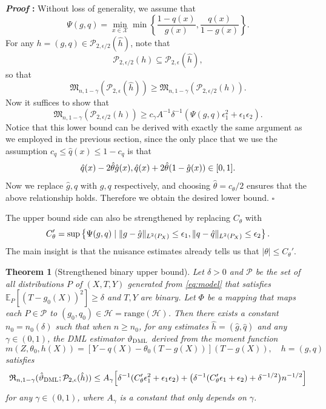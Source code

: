 \documentclass{article}
\def\eps{{\epsilon}}
\def\gH{{\mathcal{H}}}
\def\gP{{\mathcal{P}}}
\def\gX{{\mathcal{X}}}
\newcommand{\E}{\mathbb{E}}
\newtheorem{theorem}{Theorem}[section]
\renewenvironment{proof}{\noindent\textbf{\textit{Proof }:}}{\hfill$\square$}
\newcommand{\dml}{\textsc{DML}}
\begin{document}
\begin{proof}
    Without loss of generality, we assume that
    $$\Psi(g,q)=\min_{x\in\gX}\min\left\{\frac{1-q(x)}{g(x)},\frac{q(x)}{1-g(x)}\right\}.$$
    For any $h=(g,q)\in\gP_{2,\eps/2}(\hat{h})$, note that
    $$\gP_{2,\eps/2}(h) \subseteq \gP_{2,\eps}(\hat{h}),$$
    so that
    $$\mathfrak{M}_{n,1-\gamma}\left(\gP_{2,\eps}(\hat{h})\right) \geq \mathfrak{M}_{n,1-\gamma}\left(\gP_{2,\eps/2}(h)\right).$$
    Now it suffices to show that
    \begin{equation}
        \label{eq:lower-bound-half-radius}
        \mathfrak{M}_{n,1-\gamma}\left(\gP_{2,\eps/2}(h)\right) \geq c_{\gamma}  A^{-1} \delta^{-1}(\Psi(g,q)\eps_1^2+\eps_1\eps_2).
    \end{equation}
    Notice that this lower bound can be derived with exactly the same argument as we employed in the previous section, since the only place that we use the assumption $c_q\leq \hat{q}(x)\leq 1-c_q$ is that
    \begin{equation}
        \notag
        \hat{q}(x)-2\hat{\theta}\hat{g}(x), \hat{q}(x)+2\hat{\theta}(1-\hat{g}(x)) \in [0,1].
    \end{equation}
    Now we replace $\hat{g},\hat{q}$ with $g,q$ respectively, and choosing $\hat{\theta}=c_\theta/2$ ensures that the above relationship holds. Therefore we obtain the desired lower bound.
\end{proof}

The upper bound side can also be strengthened by replacing $C_{\theta}$ with 
\begin{equation}
    \notag
    C_{\theta}' = \sup\left\{ \Psi(g,q) \mid \|g-\hat{g}\|_{L^2(P_X)}\leq\eps_1, \|q-\hat{q}\|_{L^2(P_X)}\leq\eps_2\right\}.
\end{equation}
The main insight is that the nuisance estimates already tells us that $|\theta| \leq C_{\theta}'$.

\begin{theorem}[Strengthened binary upper bound]
\label{thm:binary-upper-bound-strengthen}
    Let $\delta>0$ and $\gP$ be the set of all distributions $P$ of $(X,T,Y)$ generated from \eqref{eq:model} that satisfies $\E_{P}[(T-g_0(X))^2]\geq \delta$ and $T,Y$ are binary. Let $\Phi$ be a mapping that maps each $P\in\gP$ to $(g_0,q_0)\in\gH=\mathrm{range}(\gH)$. Then there exists a constant $n_0=n_0(\delta)$ such that when $n\geq n_0$, for any estimates $\hat{h}=(\hat{g},\hat{q})$ and any $\gamma\in(0,1)$, the DML estimator $\vartheta_{\dml}$ derived from the moment function 
    \begin{equation}
    \label{eq:dml-moment}
        m(Z,\theta_0,h(X)) = [Y-q(X)-\theta_0(T-g(X))](T-g(X)), \quad h=(g,q)
    \end{equation}
    satisfies $$\mathfrak{R}_{n,1-\gamma}(\hat{\vartheta}_{\dml};\gP_{2,\eps}(\hat{h}))\leq A_{\gamma}\Big[\delta^{-1}(C_{\theta}'\eps_1^2+\eps_1\eps_2) + \big(\delta^{-1}(C_\theta'\eps_1+\eps_2) + \delta^{-1/2} \big) n^{-1/2}\Big]$$ for any $\gamma\in(0,1)$, where $A_{\gamma}$ is a constant that only depends on $\gamma$.
\end{theorem}
\end{document}
